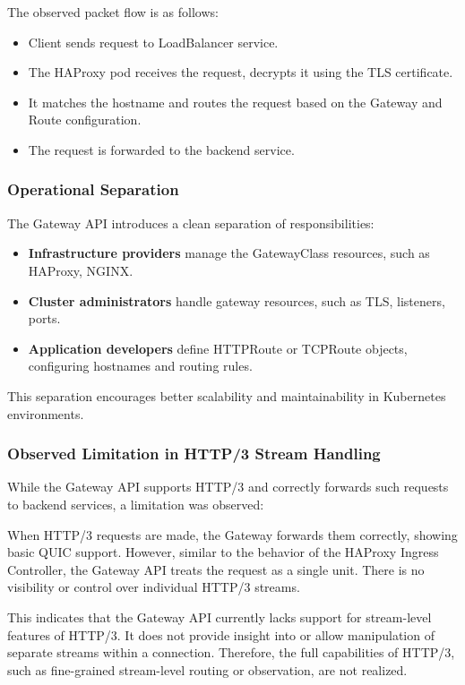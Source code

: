 The observed packet flow is as follows:

\begin{itemize}
  \item Client sends request to LoadBalancer service.
  \item The HAProxy pod receives the request, decrypts it using the TLS certificate.
  \item It matches the hostname and routes the request based on the Gateway and Route configuration.
  \item The request is forwarded to the backend service.
\end{itemize}

\subsubsection{Operational Separation}

The Gateway API introduces a clean separation of responsibilities:
\begin{itemize}
  \item \textbf{Infrastructure providers} manage the GatewayClass resources, such as HAProxy, NGINX.
  \item \textbf{Cluster administrators} handle gateway resources, such as TLS, listeners, ports.
  \item \textbf{Application developers} define HTTPRoute or TCPRoute objects, configuring hostnames and routing rules.
\end{itemize}

This separation encourages better scalability and maintainability in Kubernetes environments.

\subsubsection{Observed Limitation in HTTP/3 Stream Handling}

While the Gateway API supports HTTP/3 and correctly forwards such requests to backend services, a limitation was observed:

When HTTP/3 requests are made, the Gateway forwards them correctly, showing basic QUIC support. However, similar to the behavior of the HAProxy Ingress Controller, the Gateway API treats the request as a single unit. There is no visibility or control over individual HTTP/3 streams.

This indicates that the Gateway API currently lacks support for stream-level features of HTTP/3. It does not provide insight into or allow manipulation of separate streams within a connection. Therefore, the full capabilities of HTTP/3, such as fine-grained stream-level routing or observation, are not realized.

